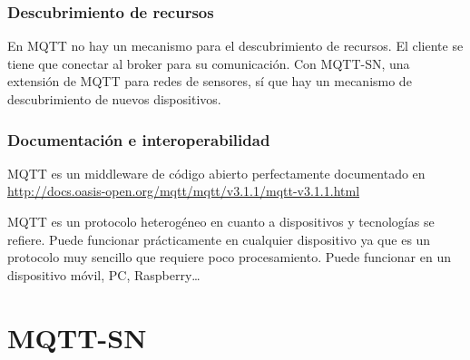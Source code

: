 \documentclass[12pt, twoside]{book}
\newcommand{\MYhref}[3][blue]{\href{#2}{\color{#1}{#3}}}
\begin{document}
\subsection{Descubrimiento de recursos}
En MQTT no hay un mecanismo para el descubrimiento de recursos. El cliente se tiene que conectar al broker para su comunicación. Con MQTT-SN, una extensión de MQTT para redes de sensores, sí que hay un mecanismo de descubrimiento de nuevos dispositivos.
\subsection{Documentación e interoperabilidad}
MQTT es un middleware de código abierto perfectamente documentado en\\
\url{ http://docs.oasis-open.org/mqtt/mqtt/v3.1.1/mqtt-v3.1.1.html}

MQTT es un protocolo heterogéneo en cuanto a dispositivos y tecnologías se refiere. Puede funcionar prácticamente en cualquier dispositivo ya que es un protocolo muy sencillo que requiere poco procesamiento. Puede funcionar en un dispositivo móvil, PC, Raspberry… 





\chapter{MQTT-SN}
\end{document}
